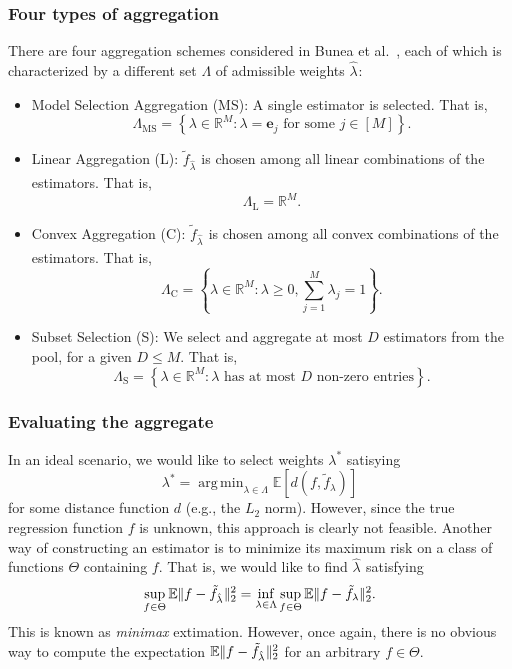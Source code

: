 \documentclass[12pt, letter paper]{article}
\newcommand{\1}{\mathmybb{1}}
\DeclareMathOperator*{\argmin}{arg\,min}
\newcommand{\R}{\mathbb{R}}
\newcommand{\0}{\emptyset}
\newcommand{\E}{\mathbb{E}}
\newcommand{\Ep}[1]{\mathbb{E}\left[ #1 \right]}
\newcommand{\paren}[1]{\left(#1 \right)}
\newcommand{\set}[1]{\left\{ #1 \right\}}
\newcommand{\norm}[1]{|\hspace{-1pt}|#1 |\hspace{-1pt}|}
\newcommand{\normsq}[1]{\norm{#1}^{2}}
\newcommand{\ftilde}[1]{\tilde{f}_{#1}}
\newcommand{\lambdahat}[1]{\hat{\lambda}_{#1}}
\begin{document}
\subsubsection{Four types of aggregation}

There are four aggregation schemes considered in Bunea et al.~\cite{bunea_2007}, each of which is characterized by a different set \(\Lambda\) of admissible weights \(\lambdahat{}\):
\begin{itemize}
    \item Model Selection Aggregation (MS): A single estimator is selected. That is,\[\Lambda_{\mathrm{MS}} = \set{\lambda\in\R^{M}:\lambda = \boldsymbol{e}_{j}\text{ for some }j\in[M]}.\]
    \item Linear Aggregation (L): \(\ftilde{\lambdahat{}}\) is chosen among all linear combinations of the estimators. That is, \[\Lambda_{\mathrm{L}} = \R^{M}.\]
    \item Convex Aggregation (C): \(\ftilde{\lambdahat{}}\) is chosen among all convex combinations of the estimators. That is, \[\Lambda_{\mathrm{C}} = \set{\lambda\in\R^{M}:\lambda\geq 0, \sum_{j=1}^{M}\lambda_{j} = 1}.\]
    \item Subset Selection (S): We select and aggregate at most \(D\) estimators from the pool, for a given \(D\leq M\). That is, \[\Lambda_{\mathrm{S}} = \set{\lambda\in\R^{M}:\lambda\text{ has at most \(D\) non-zero entries}}.\]
\end{itemize}

\subsubsection{Evaluating the aggregate}

In an ideal scenario, we would like to select  weights \(\lambda^*\) satisying 
\[\lambda^{*} = \argmin_{\lambda\in\Lambda}\Ep{d\paren{f, \ftilde{\lambda}}}\]
for some distance function \(d\) (e.g., the \(L_{2}\) norm). However, since the true regression function \(f\) is unknown, this approach is clearly not feasible. Another way of constructing an estimator is to minimize its maximum risk on a class of functions \(\Theta\) containing \(f\). That is, we would like to find \(\lambdahat{}\) satisfying 
\[\sup_{f\in\Theta}\E\normsq{f-\ftilde{\lambdahat{}}}_{2} = \inf_{\lambda\in\Lambda}\sup_{f\in\Theta}\E\normsq{f-\ftilde{\lambda}}_{2}.\]
This is known as \emph{minimax} extimation. 
However, once again, there is no obvious way to compute the expectation \(\E\normsq{f-\ftilde{\lambdahat{}}}_{2}\) for an arbitrary \(f\in\Theta\).
\end{document}
